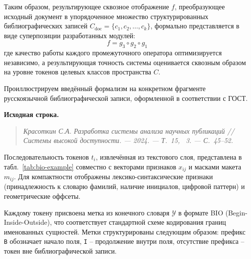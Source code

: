 Таким образом, результирующее сквозное отображение $f$, преобразующее исходный документ в упорядоченное множество структурированных библиографических записей $C_{\text{doc}} = \{c_1, c_2, \dots, c_k\}$, формально представляется в виде суперпозиции разработанных модулей:
\begin{equation}
    f = g_3 \circ g_2 \circ g_1
\end{equation}
где качество работы каждого промежуточного оператора оптимизируется независимо, а результирующая точность системы оценивается сквозным образом на уровне токенов целевых классов пространства $C$.

Проиллюстрируем введённый формализм на конкретном фрагменте русскоязычной библиографической записи, оформленной в соответствии с ГОСТ.

\textbf{Исходная строка.}
\begin{quote}
\textit{Красоткин С.А. Разработка системы анализа научных публикаций // Системы высокой доступности. --- 2024. --- Т.~15, \textnumero~3. --- С.~45--52.}
\end{quote}

Последовательность токенов $t_i$, извлечённая из текстового слоя, представлена в табл.~\ref{tab:bio-example} совместно с векторами признаков $x_{ij}$ и масками макета $m_{ij}$. Для компактности отображены лексико-синтаксические признаки (принадлежность к словарю фамилий, наличие инициалов, цифровой паттерн) и геометрические оффсеты.

Каждому токену присвоена метка из конечного словаря $\mathcal{Y}$ в формате BIO (Begin-Inside-Outside), что соответствует стандартной схеме кодирования границ именованных сущностей. Метки структурированы следующим образом: префикс \texttt{B} обозначает начало поля, \texttt{I} -- продолжение внутри поля, отсутствие префикса -- токен вне библиографической записи.

